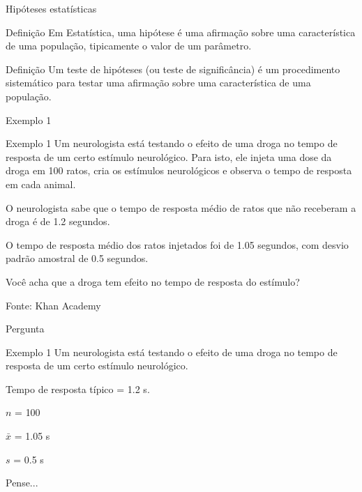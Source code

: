 \documentclass{beamer}
\begin{document}
\begin{frame}{\scriptsize Hipóteses estatísticas}
  \begin{block}{Definição}
    \footnotesize
    Em Estatística, uma \alert{hipótese} é uma afirmação sobre uma
    característica de uma população, tipicamente o valor de um
    parâmetro.
  \end{block}
  \begin{block}{Definição}
    \footnotesize
    Um \alert{teste de hipóteses} (ou teste de significância) é um
    procedimento sistemático para testar uma afirmação sobre uma
    característica de uma população.
  \end{block}
\end{frame}

\begin{frame}{\scriptsize Exemplo 1}
  \begin{exampleblock}{Exemplo 1}
    \tiny
    Um neurologista está testando o efeito de uma droga no tempo de
    resposta de um certo estímulo neurológico.
    Para isto, ele injeta uma dose da droga em 100 ratos, cria
    os estímulos neurológicos e observa o tempo de resposta em cada
    animal.

    \medskip
    O neurologista sabe que o tempo de resposta médio de ratos que não
    receberam a droga é de 1.2 segundos.

    \medskip
    O tempo de resposta médio dos ratos injetados foi de
    1.05 segundos, com desvio padrão amostral de
    0.5 segundos.
  \end{exampleblock}
  \begin{block}{}
    \scriptsize
    Você acha que a droga tem efeito no tempo de resposta do estímulo?
  \end{block}
  \hfill {\scriptsize Fonte: Khan Academy}
\end{frame}

\begin{frame}{\scriptsize Pergunta}
  \begin{exampleblock}{Exemplo 1}
    \tiny
    Um neurologista está testando o efeito de uma droga no tempo de
    resposta de um certo estímulo neurológico.

    \smallskip
    Tempo de resposta típico = \alert{1.2 s}.

    \smallskip
    $n$ = \alert{100}

    $\bar{x}$ = \alert{1.05 s}

    $s$ = \alert{0.5 s}
  \end{exampleblock}
  \begin{block}{Pense...}
    \footnotesize

    \bigskip
  \end{block}
\end{frame}
\end{document}
